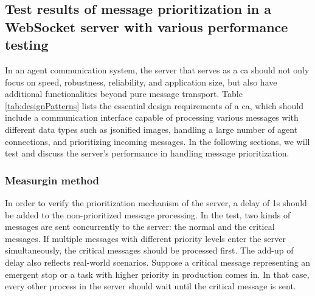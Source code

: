 \subsection{Test results of message prioritization in a WebSocket server with various 
performance testing} \label{chap: Result-priority}
In an agent communication system, the server that serves as a \gls{ca} should not only 
focus on speed, robustness, reliability, and application size, but also have additional 
functionalities beyond pure message transport. Table \ref{tab:designPatterns} lists the 
essential design requirements of a \gls{ca}, which should include a communication interface 
capable of processing various messages with different data types such as jsonified images, 
handling a large number of agent connections, and prioritizing incoming messages. 
In the following sections, we will test and discuss the server's performance in 
handling message prioritization.

\subsubsection{Measurgin method}
In order to verify the prioritization mechanism of the server, a delay of 1s should be 
added to the non-prioritized message processing. In the test, two kinds of messages are 
sent concurrently to the server: the normal and the critical messages. If multiple 
messages with different priority levels enter the server simultaneously, the critical 
messages should be processed first. The add-up of delay also reflects real-world scenarios. 
Suppose a critical message representing an emergent stop or a task with higher priority 
in production comes in. In that case, every other process in the server should wait until 
the critical message is sent. 

